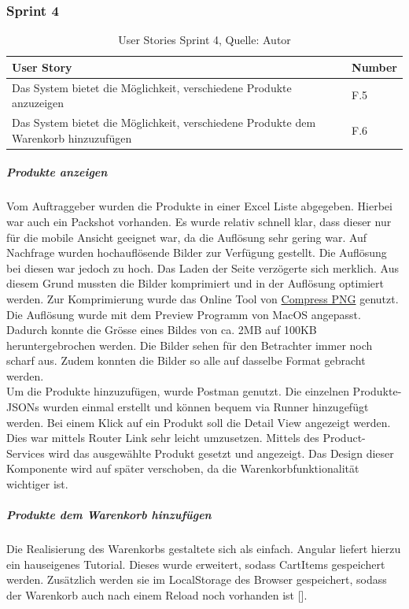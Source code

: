 \subsubsection{Sprint 4}
\begin{table}[H]
	\setlength\extrarowheight{2pt} %
	\begin{tabularx}{\textwidth}{|X|l|}
		\hline
		\textbf{User Story} & \textbf{Number} \\
		\hline
		Das System bietet die Möglichkeit, verschiedene Produkte anzuzeigen& F.5\\
		\hline
		Das System bietet die Möglichkeit, verschiedene Produkte dem Warenkorb hinzuzufügen& F.6\\
		\hline
	\end{tabularx} 
	\caption[User Stories Sprint 4]{User Stories Sprint 4, Quelle: Autor}
\end{table}\label{userStoriesSprint4}

\subparagraph{Produkte anzeigen}
Vom Auftraggeber wurden die Produkte in einer Excel Liste abgegeben. Hierbei war auch ein Packshot vorhanden. Es wurde relativ schnell klar, dass dieser nur für die mobile Ansicht geeignet war, da die Auflösung sehr gering war. Auf Nachfrage wurden hochauflösende Bilder zur Verfügung gestellt. Die Auflösung bei diesen war jedoch zu hoch. Das Laden der Seite verzögerte sich merklich. Aus diesem Grund mussten die Bilder komprimiert und in der Auflösung optimiert werden. Zur Komprimierung wurde das Online Tool von \href{https://compresspng.com/}{Compress PNG} genutzt. Die Auflösung wurde mit dem Preview Programm von MacOS angepasst. Dadurch konnte die Grösse eines Bildes von ca. 2MB auf 100KB heruntergebrochen werden. Die Bilder sehen für den Betrachter immer noch scharf aus. Zudem konnten die Bilder so alle auf dasselbe Format gebracht werden. \\
Um die Produkte hinzuzufügen, wurde Postman genutzt. Die einzelnen Produkte-JSONs wurden einmal erstellt und können bequem via Runner hinzugefügt werden. 
Bei einem Klick auf ein Produkt soll die Detail View angezeigt werden. Dies war mittels Router Link sehr leicht umzusetzen. Mittels des Product-Services wird das ausgewählte Produkt gesetzt und angezeigt. Das Design dieser Komponente wird auf später verschoben, da die Warenkorbfunktionalität wichtiger ist. 

\subparagraph{Produkte dem Warenkorb hinzufügen}
Die Realisierung des Warenkorbs gestaltete sich als einfach. Angular liefert hierzu ein hauseigenes Tutorial. Dieses wurde erweitert, sodass CartItems gespeichert werden. Zusätzlich werden sie im \gls{LocalStorage} des Browser gespeichert, sodass der Warenkorb auch nach einem Reload noch vorhanden ist [\cite{cartAngular}].

